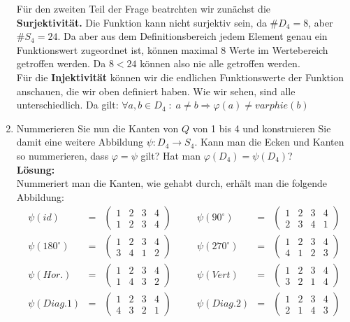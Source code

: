 \documentclass[11pt,a4paper,ngerman]{article}
\begin{document}
\begin{enumerate}[\bfseries a)]
Für den zweiten Teil der Frage beatrchten wir zunächst die\\
\textbf{Surjektivität.} Die Funktion kann nicht surjektiv sein, da $\# D_4 = 8$, aber $\# S_4 = 24$. Da aber aus dem Definitionsbereich jedem Element genau ein Funktionswert zugeordnet ist, können maximal 8 Werte im Wertebereich getroffen werden. Da $8 < 24$ können also nie alle getroffen werden.\\

Für die \textbf{Injektivität} können wir die endlichen Funktionswerte der Funktion anschauen, die wir oben definiert haben. Wie wir sehen, sind alle unterschiedlich. Da gilt: $\forall a,b \in D_4 \; : \; a \not= b \Rightarrow \varphi (a) \not= varphie (b)$ 

\item Nummerieren Sie nun die Kanten von $Q$ von 1 bis 4 und konstruieren Sie damit eine weitere Abbildung $\psi : D_4 \rightarrow S_4$. Kann man die Ecken und Kanten so nummerieren, dass $\varphi = \psi$ gilt? Hat man $\varphi ( D_4) = \psi (D_4)$?\\

\textbf{Lösung:}\\
Nummeriert man die Kanten, wie gehabt durch, erhält man die folgende Abbildung:
$$
\begin{array}{rclcrcl}
\psi (id)	&=& \begin{pmatrix} 1 & 2 & 3 & 4 \\ 1 & 2 & 3 & 4 \end{pmatrix}& \quad &
\psi (90^\circ) &=& \begin{pmatrix} 1 & 2 & 3 & 4 \\ 2 & 3 & 4 & 1 \end{pmatrix}\\
\psi (180^\circ ) &=& \begin{pmatrix} 1 & 2 & 3 & 4 \\ 3 & 4 & 1 & 2 \end{pmatrix}&&
\psi (270^\circ ) &=& \begin{pmatrix} 1 & 2 & 3 & 4 \\ 4 & 1 & 2 & 3 \end{pmatrix}\\
\psi (Hor.) &=& \begin{pmatrix} 1 & 2 & 3 & 4 \\ 1 & 4 & 3 & 2 \end{pmatrix}&&
\psi (Vert) &=& \begin{pmatrix} 1 & 2 & 3 & 4 \\ 3 & 2 & 1 & 4 \end{pmatrix}\\
\psi (Diag. 1) &=& \begin{pmatrix} 1 & 2 & 3 & 4 \\ 4 & 3 & 2 & 1 \end{pmatrix}&&
\psi (Diag. 2) &=& \begin{pmatrix} 1 & 2 & 3 & 4 \\ 2 & 1 & 4 & 3 \end{pmatrix}\\
\end{array}
$$


\end{enumerate}
\end{document}
